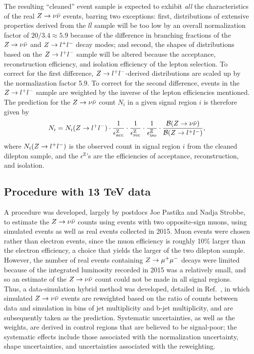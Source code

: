 The resulting ``cleaned'' event sample is expected to exhibit {\it all} the characteristics of the real $Z\rightarrow \nu\bar{\nu}$ events, barring two exceptions: first, distributions of extensive properties derived from the $l\bar{l}$ sample will be too low by an overall normalization factor of $20/3.4\approx5.9$ because of the difference in branching fractions of the $Z\rightarrow \nu\bar{\nu}$ and $Z\rightarrow l^+l^-$ decay modes; and second, the shapes of distributions based on the $Z\rightarrow l^+l^-$ sample will be altered because the acceptance, reconstruction efficiency, and isolation efficiency of the lepton selection. To correct for the first difference, $Z\rightarrow l^+l^-$-derived distributions are scaled up by the normalization factor 5.9. To correct for the second difference, events in the $Z\rightarrow l^+l^-$ sample are weighted by the inverse of the lepton efficiencies mentioned. The prediction for the $Z\rightarrow \nu\bar{\nu}$ count $N_i$ in a given signal region $i$ is therefore given by
\begin{equation}
N_i = N_i(Z\rightarrow l^+l^-)\cdot\frac{1}{\epsilon^{\text{Z}}_{\text{acc}}}\cdot\frac{1}{\epsilon^{\text{Z}}_{\text{rec}}}\cdot\frac{1}{\epsilon^{\text{Z}}_{\text{iso}}}\cdot\frac{\mathcal{B}(Z\rightarrow \nu\bar{\nu})}{\mathcal{B}(Z\rightarrow l^+l^-)},
\label{eq:zinv}
\end{equation}
where $N_i(Z\rightarrow l^+l^-)$ is the observed count in signal region $i$ from the cleaned dilepton sample, and the $\epsilon^{\text{Z}}$'s are the efficiencies of acceptance, reconstruction, and isolation.

\subsection{Procedure with 13 TeV data} 
A procedure was developed, largely by postdocs Joe Pastika and Nadja Strobbe, to estimate the $Z\rightarrow \nu\bar{\nu}$ counts using events with two opposite-sign muons, using simulated events as well as real events collected in 2015. Muon events were chosen rather than electron events, since the muon efficiency is roughly 10\% larger than the electron efficiency, a choice that yields the larger of the two dilepton sample. However, the number of real events containing $Z\rightarrow \mu^+\mu^-$ decays were limited because of the integrated luminosity recorded in 2015 was a relatively small, and so an estimate of the $Z\rightarrow \nu\bar{\nu}$ count could not be made in all signal regions. Thus, a data-simulation hybrid method was developed, detailed in Ref.~\cite{CMS:2016nhb}, in which simulated $Z\rightarrow \nu\bar{\nu}$ events are reweighted based on the ratio of counts between data and simulation in bins of jet multiplicity and b-jet multiplicity, and are subsequently taken as the prediction. Systematic uncertainties, as well as the weights, are derived in control regions that are believed to be signal-poor; the systematic effects include those associated with the normalization uncertainty, shape uncertainties, and uncertainties associated with the reweighting. 

